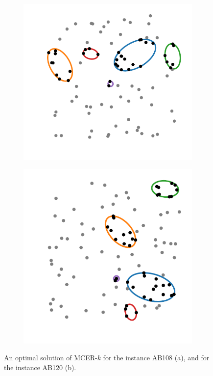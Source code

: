 \begin{figure}[!htb]
	
\begin{subfigure}{.5\textwidth}
	\centering
	\includegraphics[scale=.85]{figures/AB108}
	\caption{}
	\label{fig:AB108}
\end{subfigure}
\begin{subfigure}{.5\textwidth}
	\centering
	\includegraphics[scale=.85]{figures/AB120}
	\caption{}
	\label{fig:AB120}
\end{subfigure}
	\caption{An optimal solution of MCER-$k$ for the instance AB108 (a), and for the instance AB120 (b).}
\end{figure}

